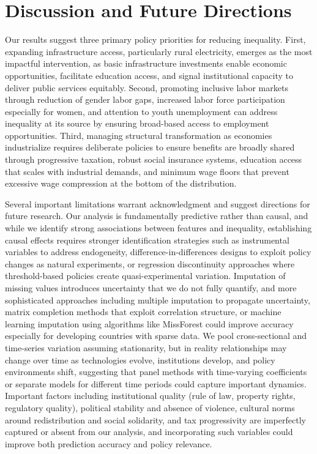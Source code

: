 \documentclass[10pt,twocolumn]{article}
\begin{document}
\section{Discussion and Future Directions}
\par Our results suggest three primary policy priorities for reducing inequality. First, expanding infrastructure access, particularly rural electricity, emerges as the most impactful intervention, as basic infrastructure investments enable economic opportunities, facilitate education access, and signal institutional capacity to deliver public services equitably. Second, promoting inclusive labor markets through reduction of gender labor gaps, increased labor force participation especially for women, and attention to youth unemployment can address inequality at its source by ensuring broad-based access to employment opportunities. Third, managing structural transformation as economies industrialize requires deliberate policies to ensure benefits are broadly shared through progressive taxation, robust social insurance systems, education access that scales with industrial demands, and minimum wage floors that prevent excessive wage compression at the bottom of the distribution.
\par Several important limitations warrant acknowledgment and suggest directions for future research. Our analysis is fundamentally predictive rather than causal, and while we identify strong associations between features and inequality, establishing causal effects requires stronger identification strategies such as instrumental variables to address endogeneity, difference-in-differences designs to exploit policy changes as natural experiments, or regression discontinuity approaches where threshold-based policies create quasi-experimental variation. Imputation of missing values introduces uncertainty that we do not fully quantify, and more sophisticated approaches including multiple imputation to propagate uncertainty, matrix completion methods that exploit correlation structure, or machine learning imputation using algorithms like MissForest could improve accuracy especially for developing countries with sparse data. We pool cross-sectional and time-series variation assuming stationarity, but in reality relationships may change over time as technologies evolve, institutions develop, and policy environments shift, suggesting that panel methods with time-varying coefficients or separate models for different time periods could capture important dynamics. Important factors including institutional quality (rule of law, property rights, regulatory quality), political stability and absence of violence, cultural norms around redistribution and social solidarity, and tax progressivity are imperfectly captured or absent from our analysis, and incorporating such variables could improve both prediction accuracy and policy relevance.
\end{document}
